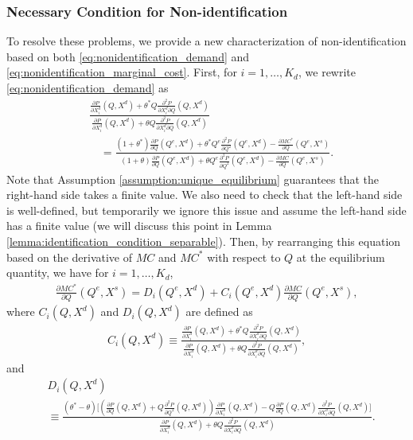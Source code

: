 \documentclass[11pt, a4paper]{article}
\theoremstyle{remark}
\begin{document}
\subsubsection{Necessary Condition for Non-identification}
To resolve these problems, we provide a new characterization of non-identification based on both \eqref{eq:nonidentification_demand} and \eqref{eq:nonidentification_marginal_cost}.
First, for $i = 1, \ldots, K_d$, we rewrite \eqref{eq:nonidentification_demand} as
\begin{align}
    &\frac{\frac{\partial P}{\partial X^{d}_i}(Q, X^{d}) + \theta^{*} Q\frac{\partial^2 P}{\partial X^{d}_{i}\partial Q}(Q, X^{d}) }{\frac{\partial P}{\partial X^{d}_i}(Q, X^{d}) + \theta Q\frac{\partial^2 P}{\partial X^{d}_{i}\partial Q}(Q, X^{d}) }\\ 
    & \quad = \frac{(1+\theta^{*})\frac{\partial P}{\partial Q}(Q^e, X^{d}) + \theta^{*} Q^e\frac{\partial^2 P}{\partial Q^2}(Q^e, X^{d}) - \frac{\partial MC^{*}}{\partial Q}(Q^e, X^{s})}{(1+\theta)\frac{\partial P}{\partial Q}(Q^e, X^{d}) + \theta Q^e\frac{\partial^2 P}{\partial Q^2}(Q^e, X^{d}) - \frac{\partial MC}{\partial Q}(Q^e, X^{s})}.
\end{align}
Note that Assumption \ref{assumption:unique_equilibrium} guarantees that the right-hand side takes a finite value.
We also need to check that the left-hand side is well-defined, but temporarily we ignore this issue and
assume the left-hand side has a finite value (we will discuss this point in Lemma \ref{lemma:identification_condition_separable}).
Then, by rearranging this equation based on the derivative of $MC$ and $MC^{*}$ with respect to $Q$ at the equilibrium quantity, we have for $i = 1, \ldots, K_d$,
\begin{align}
    \frac{\partial MC^{*}}{\partial Q}(Q^e, X^{s}) =D_i(Q^e, X^{d}) + C_i(Q^e, X^{d})\frac{\partial MC}{\partial Q}(Q^e, X^{s}),\label{eq:mc_transformation_quantity}
\end{align}
where $C_i(Q, X^{d})$ and $D_i(Q, X^{d})$ are defined as
\begin{align}
    C_i(Q, X^{d}) \equiv \frac{\frac{\partial P}{\partial X^{d}_i}(Q, X^{d}) + \theta^{*} Q\frac{\partial^2 P}{\partial X^{d}_{i}\partial Q}(Q, X^{d}) }{\frac{\partial P}{\partial X^{d}_i}(Q, X^{d}) + \theta Q\frac{\partial^2 P}{\partial X^{d}_{i}\partial Q}(Q, X^{d}) },\label{eq:ratio_marginal_revenue}
\end{align}
and
\begin{align}
    &D_i(Q, X^{d})\\
    &\equiv\frac{(\theta^{*} - \theta)\Bigg[\left(\frac{\partial P}{\partial Q}(Q, X^{d}) + Q\frac{\partial^2 P}{\partial Q^2}(Q, X^{d})\right) \frac{\partial P}{\partial X^{d}_i}(Q, X^{d}) - Q \frac{\partial P}{\partial Q}(Q, X^{d}) \frac{\partial^2 P}{\partial X^{d}_i\partial Q}(Q, X^{d}) \Bigg]}{\frac{\partial P}{\partial X^{d}_i}(Q, X^{d}) + \theta Q\frac{\partial^2 P}{\partial X^{d}_{i}\partial Q}(Q, X^{d})}.\label{eq:intercation_derivative_demand}
\end{align}
\end{document}
